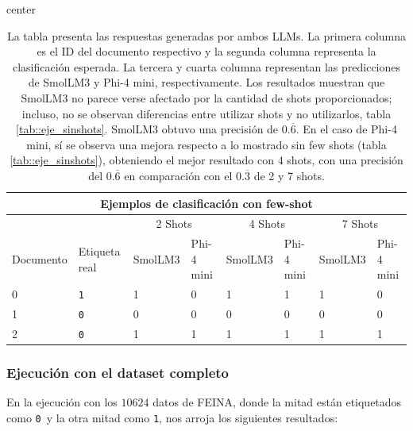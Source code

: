 \documentclass[12pt]{article}
\newcommand{\claseSimple}{\texttt{0}}
\newcommand{\claseCompleja}{\texttt{1}}
\begin{document}
\begin{table}[H]
\centering
\begin{adjustbox}{center}
\begin{tabular}{llllllll}
\multicolumn{8}{c}{Ejemplos de clasificación con few-shot} \\
\toprule
& & \multicolumn{2}{c}{2 Shots} & \multicolumn{2}{c}{4 Shots} & \multicolumn{2}{c}{7 Shots} \\
Documento & Etiqueta real & SmolLM3 & Phi-4 mini & SmolLM3 & Phi-4 mini & SmolLM3 & Phi-4 mini \\
\midrule
0 & \claseCompleja & 1 & 0 & 1 & 1 & 1 & 0 \\
1 & \claseSimple & 0 & 0 & 0 & 0 & 0 & 0 \\
2 & \claseSimple & 1 & 1 & 1 & 1 & 1 & 1 \\
\bottomrule
\end{tabular}
\end{adjustbox}
\caption{La tabla presenta las respuestas generadas por ambos LLMs. La primera columna es el ID del documento respectivo y la segunda columna representa la clasificación esperada. La tercera y cuarta columna representan las predicciones de SmolLM3 y Phi-4 mini, respectivamente. Los resultados muestran que SmolLM3 no parece verse afectado por la cantidad de shots proporcionados; incluso, no se observan diferencias entre utilizar shots y no utilizarlos, tabla \ref{tab::eje_sinshots}. SmolLM3 obtuvo una precisión de $0.\overline{6}$. En el caso de Phi-4 mini, sí se observa una mejora respecto a lo mostrado sin few shots (tabla \ref{tab::eje_sinshots}), obteniendo el mejor resultado con 4 shots, con una precisión del $0.\overline{6}$ en comparación con el $0.\overline{3}$ de 2 y 7 shots.}
\end{table}

\subsubsection{Ejecución con el dataset completo}
En la ejecución con los $10624$ datos de FEINA, donde la mitad están etiquetados como \claseSimple \ y la otra mitad como \claseCompleja, nos arroja los siguientes resultados:
\end{document}
